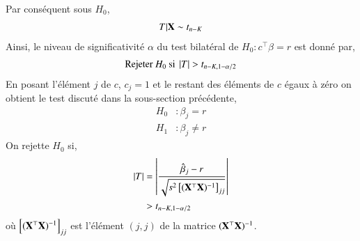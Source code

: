 \documentclass[10pt, reqno]{amsart}
\begin{document}
Par conséquent sous $H_0$,
\begin{align*}
T | \mathbf X\sim t_{n-K}
\end{align*}
Ainsi, le niveau de significativité $\alpha$ du test bilatéral de $H_0: c^\top\beta = r$ est donné par,
\begin{align*}
\textrm{Rejeter} \ H_0 \ \textrm{si} \ \left\vert {T} \right\vert > t_{n-K, 1-\alpha/2}
\end{align*}
En posant l'élément $j$ de $c$, $c_j=1$ et le restant des éléments de $c$ égaux à zéro on obtient le test discuté dans la sous-section précédente,
\begin{align*}
H_0&: \beta_j = r\\
H_1&:\beta_j \neq r
\end{align*}
On rejette $H_0$ si,
\begin{align*}
\left\vert {T} \right\vert &= \left\vert { \frac{\hat{\beta}_j - r}{\sqrt{s^2\left[(\mathbf X^\top\mathbf X)^{-1}\right]_{jj}}}} \right\vert\\
&> t_{n-K, 1-\alpha/2}
\end{align*}
où $\left[(\mathbf X^\top\mathbf X)^{-1}\right]_{jj}$ est l'élément $(j,j)$ de la matrice $(\mathbf X^\top\mathbf X)^{-1}$.
\end{document}
